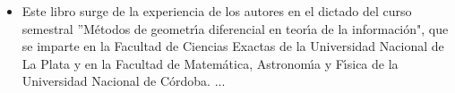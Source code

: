 \begin{itemize}
\item[] Este  libro surge  de la experiencia  de los  autores en el  dictado del
  curso semestral ''M\'etodos de geometr\'{\i}a diferencial en teor\'{\i}a de la
  informaci\'on",  que se  imparte  en la  Facultad  de Ciencias  Exactas de  la
  Universidad  Nacional  de   La  Plata  y  en  la   Facultad  de  Matem\'atica,
  Astronom\'{\i}a y F\'{\i}sica de la Universidad Nacional de C\'ordoba.  ...

\end{itemize}